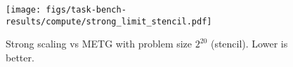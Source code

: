 \begin{figure}[t]
\centering
\texttt{[image: figs/task-bench-results/compute/strong\_limit\_stencil.pdf]}
\vspace{-0.6cm}
\caption{\color{blue} Strong scaling vs METG with problem size $2^{20}$ (stencil). Lower is better.\label{fig:strong-scaling}}
\vspace{-0.35cm}
\end{figure}

